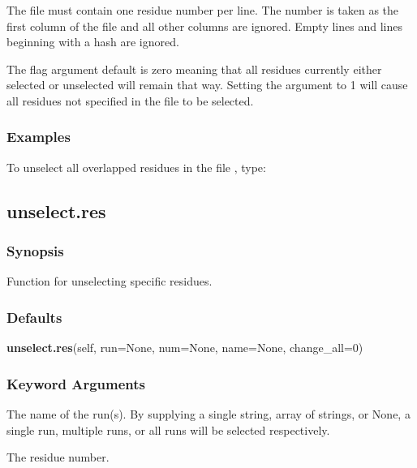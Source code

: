The file must contain one residue number per line.  The number is taken as the first column of the file and all other columns are ignored.  Empty lines and lines beginning with a hash are ignored.


The  flag argument default is zero meaning that all residues currently either selected or unselected will remain that way.  Setting the argument to 1 will cause all residues not specified in the file to be selected.



\subsubsection{Examples}

To unselect all overlapped residues in the file , type:






\newpage

\subsection{unselect.res}


\subsubsection{Synopsis}

Function for unselecting specific residues.



\subsubsection{Defaults}

\textsf{\textbf{unselect.res}(self, run=None, num=None, name=None, change\_all=0)}


\subsubsection{Keyword Arguments}

  The name of the run(s).  By supplying a single string, array of strings, or None, a single run, multiple runs, or all runs will be selected respectively. 

  The residue number. 

